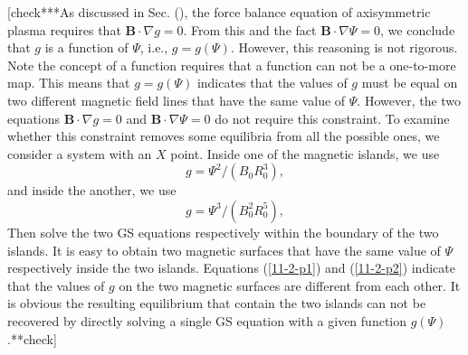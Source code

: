 \documentclass{llncs}
\begin{document}
[check***As discussed in Sec. (), the force balance equation of axisymmetric
plasma requires that $\mathbf{B} \cdot \nabla g = 0$. From this and the fact
$\mathbf{B} \cdot \nabla \Psi = 0$, we conclude that $g$ is a function of
$\Psi$, i.e., $g = g (\Psi)$. However, this reasoning is not rigorous. Note
the concept of a function requires that a function can not be a one-to-more
map. This means that $g = g (\Psi)$ indicates that the values of $g$ must be
equal on two different magnetic field lines that have the same value of
$\Psi$. However, the two equations $\mathbf{B} \cdot \nabla g = 0$ and
$\mathbf{B} \cdot \nabla \Psi = 0$ do not require this constraint. To examine
whether this constraint removes some equilibria from all the possible ones, we
consider a system with an $X$ point. Inside one of the magnetic islands, we
use
\begin{equation}
  \label{11-2-p1} g = \Psi^2 / (B_0 R_0^3),
\end{equation}
and inside the another, we use
\begin{equation}
  \label{11-2-p2} g = \Psi^3 / (B_0^2 R_0^5),
\end{equation}
Then solve the two GS equations respectively within the boundary of the two
islands. It is easy to obtain two magnetic surfaces that have the same value
of $\Psi$ respectively inside the two islands. Equations (\ref{11-2-p1}) and
(\ref{11-2-p2}) indicate that the values of $g$ on the two magnetic surfaces
are different from each other. It is obvious the resulting equilibrium that
contain the two islands can not be recovered by directly solving a single GS
equation with a given function $g (\Psi)$.**check]
\end{document}
